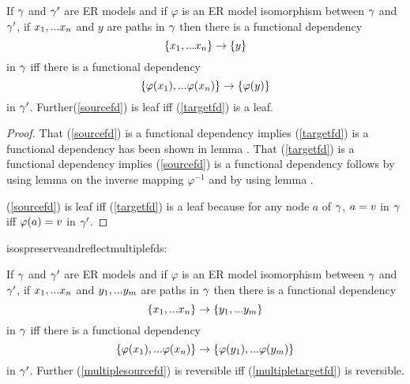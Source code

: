 \begin{lemma}
\label{isospreserveandreflectfds}
If $\gamma$ and $\gamma'$ are ER models and  if  $\varphi$ is an ER model isomorphism between $\gamma$  and $\gamma'$,  if $x_1,...x_n$ and $y$ are paths in $\gamma$
then there is a  functional dependency
\begin{equation}
\label{sourcefd}
\left\{x_1,...x_n\right\} \rightarrow \left\{y\right\}
\end{equation} 
in $\gamma$ iff there is a functional dependency
\begin{equation}
\label{targetfd}
\left\{\varphi(x_1),...\varphi(x_n)\right\} \rightarrow \left\{\varphi(y)\right\}
\end{equation}
in $\gamma'$.
Further(\ref{sourcefd}) is  leaf  iff (\ref{targetfd}) is a leaf.

\end{lemma}
\begin{proof}
\vspace{0.5cm}
That (\ref{sourcefd}) is a functional dependency implies
(\ref{targetfd}) is a functional dependency has been shown in lemma . That (\ref{targetfd}) is a functional dependency implies
(\ref{sourcefd}) is a functional dependency follows by using lemma 
on the inverse mapping $\varphi^{-1}$ and by using lemma  .

(\ref{sourcefd}) is  leaf  iff (\ref{targetfd}) is a leaf 
because for any node $a$ of $\gamma$, $a= v$ in $\gamma$ iff $\varphi(a)=v$ in $\gamma'$.
\end{proof}

isospreserveandreflectmultiplefds:
\begin{corollary}
If $\gamma$ and $\gamma'$ are ER models and  if  $\varphi$ is an ER model isomorphism between $\gamma$  and $\gamma'$,  if $x_1,...x_n$ and $y_1,...y_m$ are paths 
in $\gamma$
then there is a  functional dependency
\begin{equation}
\label{multiplesourcefd}
\left\{x_1,...x_n\right\} \rightarrow \left\{y_1,...y_m\right\}
\end{equation} 
in $\gamma$ iff there is a functional dependency
\begin{equation}
\label{multipletargetfd}
\left\{\varphi(x_1),...\varphi(x_n)\right\} \rightarrow \left\{\varphi(y_1),...\varphi(y_m)\right\}
\end{equation}
in $\gamma'$.
Further (\ref{multiplesourcefd}) is reversible iff (\ref{multipletargetfd}) is reversible.
\end{corollary}

